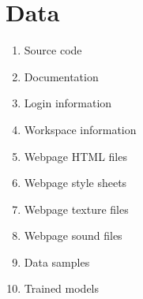 \section{Data}

\begin{enumerate}
    \item Source code   %
    \item Documentation %
    \item Login information
    \item Workspace information
    \item Webpage HTML files
    \item Webpage style sheets
    \item Webpage texture files
    \item Webpage sound files
    \item Data samples
    \item Trained models
\end{enumerate}




